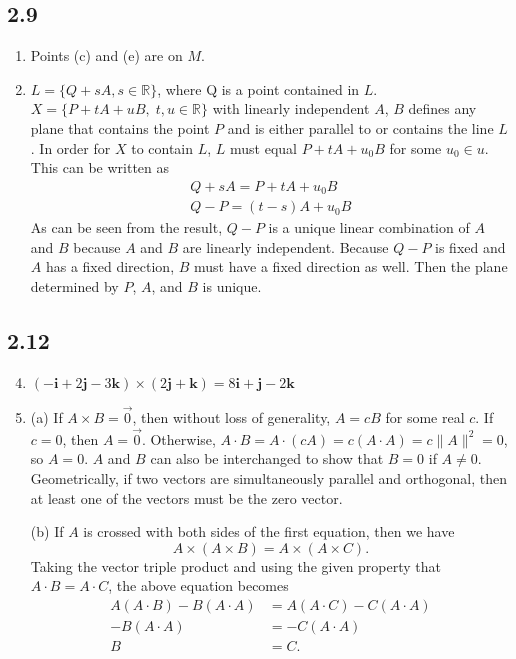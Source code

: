 \documentclass[a4paper,12pt]{article}
\begin{document}
\subsection*{2.9}

\begin{enumerate}

\item Points (c) and (e) are on $M$.

\setcounter{enumi}{13}
\item $L = \{Q + sA, s \in \mathbb{R}\}$, where Q is a point contained in $L$. $X = \{P + tA + uB, \; t, u \in \mathbb{R}\}$ with linearly independent $A$, $B$ defines any plane that contains the point $P$ and is either parallel to or contains the line $L$. In order for $X$ to contain $L$, $L$ must equal $P + tA + u_0B$ for some $u_0 \in u$. This can be written as
\begin{gather*}
Q + sA = P + tA + u_0B \\
Q - P = (t - s)A + u_0B
\end{gather*}
As can be seen from the result, $Q - P$ is a unique linear combination of $A$ and $B$ because $A$ and $B$ are linearly independent. Because $Q - P$ is fixed and $A$ has a fixed direction, $B$ must have a fixed direction as well. Then the plane determined by $P$, $A$, and $B$ is unique.

\end{enumerate}

\subsection*{2.12}

\begin{enumerate}

\setcounter{enumi}{3}
\item $(-\bm{i} + 2\bm{j} - 3\bm{k}) \times (2\bm{j} + \bm{k}) = 8\bm{i} + \bm{j} - 2\bm{k}$
\setcounter{enumi}{7}
\item (a) If $A \times B = \vec{0}$, then without loss of generality, $A = cB$ for some real $c$. If $c = 0$, then $A = \vec{0}$. Otherwise, $A \cdot B = A \cdot (cA) = c(A \cdot A) = c\|A\|^2 = 0$, so $A = 0$. $A$ and $B$ can also be interchanged to show that $B = 0$ if $A \not= 0$. Geometrically, if two vectors are simultaneously parallel and orthogonal, then at least one of the vectors must be the zero vector. \par
(b) If $A$ is crossed with both sides of the first equation, then we have
\[ A \times (A \times B) = A \times (A \times C). \]
Taking the vector triple product and using the given property that $A \cdot B = A \cdot C$, the above equation becomes
\begin{align*}
A(A \cdot B) - B(A \cdot A) &= A(A \cdot C) - C(A \cdot A) \\
-B(A \cdot A) &= -C(A \cdot A) \\
B &= C.
\end{align*}

\end{enumerate}
\end{document}

